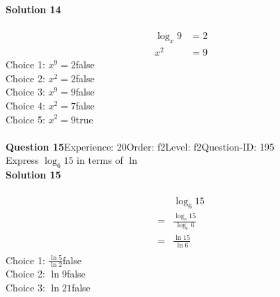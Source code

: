 \documentclass{article}
\begin{document}
\noindent\textbf{Solution 14}\\[2pt]
\\[-35pt]\begin{align*}
\log_x9&=2\\[2pt]
x^2&=9
\end{align*}
Choice 1: \hspace{20pt}$x^9=2$\hspace{20pt}false\\
Choice 2: \hspace{20pt}$x^2=2$\hspace{20pt}false\\
Choice 3: \hspace{20pt}$x^9=9$\hspace{20pt}false\\
Choice 4: \hspace{20pt}$x^2=7$\hspace{20pt}false\\
Choice 5: \hspace{20pt}$x^2=9$\hspace{20pt}true\\
\\[4pt]
\noindent\textbf{Question 15}\hspace{20pt}Experience: 20\hspace{20pt}Order: f2\hspace{20pt}Level: f2\hspace{20pt}Question-ID: 195\\[2pt]
Express $\log_{6}15$ in terms of $\ln$\\[4pt]
\noindent\textbf{Solution 15}\\[2pt]
\\[-35pt]\begin{align*}
&\log_{6}15\\[2pt]
=&\displaystyle\frac{\log_{e}15}{\log_{e}6}\\[2pt]
=&\displaystyle\frac{\ln15}{\ln6}\\[-100pt]
\end{align*}
Choice 1: \hspace{20pt}$\displaystyle\frac{\ln5}{\ln2}$\hspace{20pt}false\\
Choice 2: \hspace{20pt}$\ln{9}$\hspace{20pt}false\\
Choice 3: \hspace{20pt}$\ln{21}$\hspace{20pt}false\\
\end{document}
